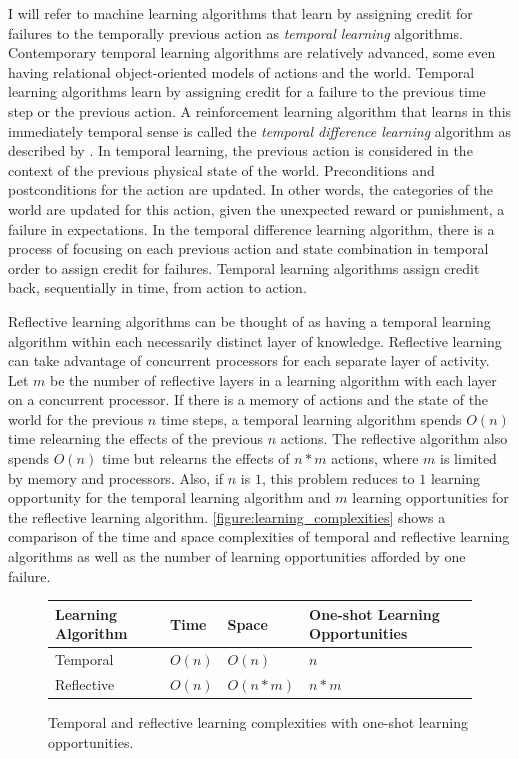 I will refer to machine learning algorithms that learn by assigning
credit for failures to the temporally previous action as
\emph{temporal learning} algorithms.  Contemporary temporal learning
algorithms are relatively advanced, some even having relational
object-oriented models of actions and the world.  Temporal learning
algorithms learn by assigning credit for a failure to the previous
time step or the previous action.  A reinforcement learning algorithm
that learns in this immediately temporal sense is called the
\emph{temporal difference learning} algorithm as described by
\cite*{kaelbling:1996}.  In temporal learning, the previous action is
considered in the context of the previous physical state of the world.
Preconditions and postconditions for the action are updated.  In other
words, the categories of the world are updated for this action, given
the unexpected reward or punishment, a failure in expectations.  In
the temporal difference learning algorithm, there is a process of
focusing on each previous action and state combination in temporal
order to assign credit for failures.  Temporal learning algorithms
assign credit back, sequentially in time, from action to action.

Reflective learning algorithms can be thought of as having a temporal
learning algorithm within each necessarily distinct layer of
knowledge.  Reflective learning can take advantage of concurrent
processors for each separate layer of activity.  Let $m$ be the number
of reflective layers in a learning algorithm with each layer on a
concurrent processor.  If there is a memory of actions and the state
of the world for the previous $n$ time steps, a temporal learning
algorithm spends $O(n)$ time relearning the effects of the previous
$n$ actions.  The reflective algorithm also spends $O(n)$ time but
relearns the effects of $n*m$ actions, where $m$ is limited by memory
and processors.  Also, if $n$ is $1$, this problem reduces to $1$
learning opportunity for the temporal learning algorithm and $m$
learning opportunities for the reflective learning algorithm.
{\mbox{\autoref{figure:learning_complexities}}} shows a comparison of
the time and space complexities of temporal and reflective learning
algorithms as well as the number of learning opportunities afforded by
one failure.
\begin{figure}
\center
\begin{tabular}{p{2cm}|p{2cm}|p{2cm}|p{3cm}}
Learning Algorithm & Time   & Space    & One-shot Learning Opportunities \\
\hline
Temporal           & $O(n)$ & $O(n)$   & $n$   \\
Reflective         & $O(n)$ & $O(n*m)$ & $n*m$ \\
\end{tabular}
\caption{Temporal and reflective learning complexities with one-shot learning opportunities.}
\label{figure:learning_complexities}
\end{figure}

